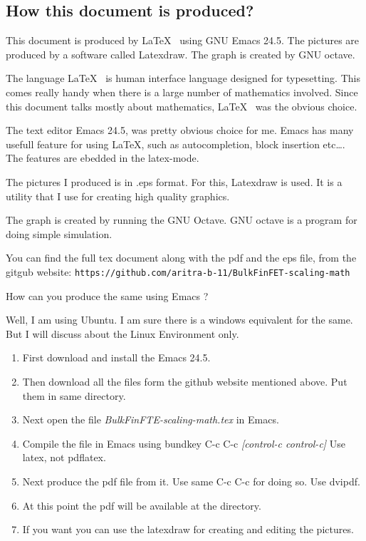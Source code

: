 \documentclass[a4paper]{article}
\begin{document}
\begin{appendices}
  \section{How this document is produced?}
  This document is produced by \LaTeX~ using GNU Emacs 24.5. The pictures are produced by a software called Latexdraw. The graph is created by GNU octave.

  The language \LaTeX~ is human interface language designed for typesetting. This comes really handy when there is a large number of mathematics involved. Since this document talks mostly about mathematics, \LaTeX~ was the obvious choice.

  The text editor Emacs 24.5, was pretty obvious choice for me. Emacs has many usefull feature for using \LaTeX, such as autocompletion, block insertion etc\ldots. The features are ebedded in the latex-mode.

  The pictures I produced is in .eps format. For this, Latexdraw is used. It is a utility that I use for creating high quality graphics.

  The graph is created by running the GNU Octave. GNU octave is a program for doing simple simulation.

  You can find the full tex document along with the pdf and the eps file, from the gitgub website: \texttt{https://github.com/aritra-b-11/BulkFinFET-scaling-math}

  How can you produce the same using Emacs ?

  Well, I am using Ubuntu. I am sure there is a windows equivalent for the same. But I will discuss about the Linux Environment only.

  \begin{enumerate}
  \item First download and install the Emacs 24.5.
  \item Then download all the files form the github website mentioned above. Put them in same directory.
  \item Next open the file \textit{BulkFinFTE-scaling-math.tex} in Emacs.
  \item Compile the file in Emacs using bundkey C-c C-c \textit{[control-c control-c]} Use latex, not pdflatex.
  \item Next produce the pdf file from it. Use same C-c C-c for doing so. Use dvipdf.
  \item At this point the pdf will be available at the directory.
  \item If you want you can use the latexdraw for creating and editing the pictures.
  \end{enumerate}


\end{appendices}
\end{document}
